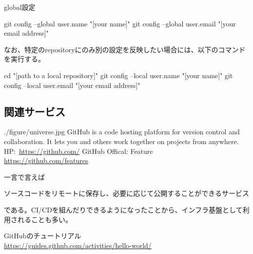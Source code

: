 \documentclass[10pt,a4j,openany,dvipdfmx]{jsarticle}
\begin{document}
global設定
\begin{commandshell}
git config --global user.name "[your name]"
git config --global user.email "[your email address]"
\end{commandshell}

なお、特定のrepositoryにのみ別の設定を反映したい場合には、以下のコマンドを実行する。
\begin{commandshell}
cd "[path to a local repository]"
git config --local user.name "[your name]"
git config --local user.email "[your email address]"
\end{commandshell}



\subsection{関連サービス} %
\label{sub:関連サービス}


\begin{picturebox}[title=GitHubについて]{./figure/universe.jpg}
GitHub is a code hosting platform for version control and collaboration. It lets you and others work together on projects from anywhere.\\
HP:\ \url{https://github.com/}
\tcblower
GitHub Offical: Feature\\
\url{https://github.com/features}
\end{picturebox}

一言で言えば
\begin{tcolorbox}[enhanced, fuzzy halo=0.5mm with Gray, frame style image=blueshade.png]
ソースコードをリモートに保存し、必要に応じて公開することができるサービス
\end{tcolorbox}
である。CI/CDを組んだりできるようになったことから、インフラ基盤として利用されることも多い。


GitHubのチュートリアル\\
\url{https://guides.github.com/activities/hello-world/}


\end{document}
